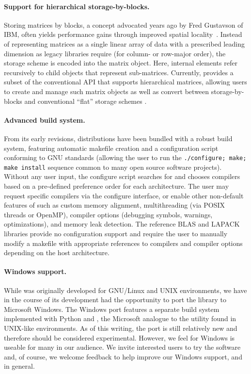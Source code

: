 \paragraph{Support for hierarchical storage-by-blocks.}
Storing matrices by blocks, a concept advocated years ago by Fred Gustavson
of IBM, often yields performance gains through improved spatial locality~\cite{gustavson1,SIAMrec,gustavson3}.
Instead of representing matrices as a single linear array of data with a
prescribed leading dimension as legacy libraries require (for column- or
row-major order), the storage scheme is encoded into the matrix object.
Here, internal elements refer recursively to child objects that
represent sub-matrices.
Currently, \libflame provides a subset of the conventional API that supports
hierarchical matrices, allowing users to create and manage such matrix
objects as well as convert between storage-by-blocks and conventional
``flat'' storage schemes \cite{SuperMatrix:TOMS,FLASH:TR}. 

\paragraph{Advanced build system.}
From its early revisions, \libflame distributions have been bundled with a
robust build system, featuring automatic makefile creation and a
configuration script conforming to GNU standards (allowing the user to run
the {\tt ./configure; make; make install} sequence common to many open source
software projects).
Without any user input, the configure script searches for and chooses
compilers based on a pre-defined preference order for each architecture.
The user may request specific compilers via the configure interface, or
enable other non-default features of \libflame such as custom memory
alignment, multithreading (via POSIX threads or OpenMP), compiler options
(debugging symbols, warnings, optimizations), and memory leak detection.
The reference BLAS and LAPACK libraries provide no configuration support
and require the user to manually modify a makefile with appropriate
references to compilers and compiler options depending on the host
architecture. 

\paragraph{Windows support.}
While \libflame was originally developed for GNU/Linux and UNIX environments,
we have in the course of its development had the opportunity to port the
library to Microsoft Windows.
The Windows port features a separate build system implemented with Python
and \nmakens, the Microsoft analogue to the \make utility found in UNIX-like
environments.
As of this writing, the port is still relatively new and therefore should be
considered experimental.
However, we feel \libflame for Windows is useable for many in our audience.
We invite interested users to try the software and, of course, we welcome
feedback to help improve our Windows support, and \libflame in general.

